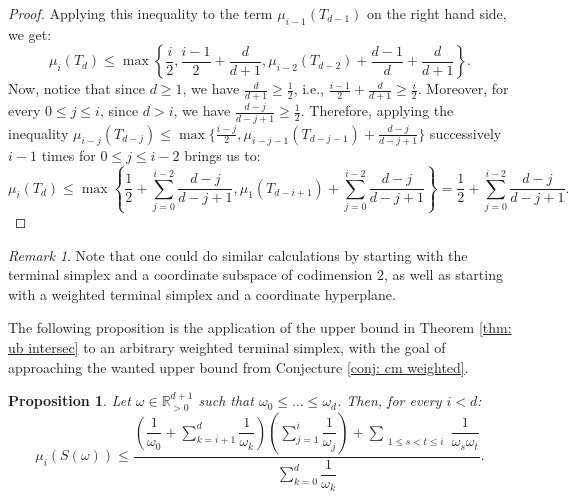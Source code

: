 \documentclass{amsart}
\newtheorem{proposition}[theorem]{Proposition}
\theoremstyle{definition}
\theoremstyle{remark}
\newtheorem{remark}[theorem]{Remark}
\newcommand{\R}{\mathbb{R}}
\begin{document}
\begin{proof}
Applying this inequality to the term $\mu_{i-1}(T_{d-1})$ on the right hand side, we get:
$$\mu_i(T_d)\leqslant \max \left\{ \frac{i}{2}, \frac{i-1}{2}+\frac{d}{d+1}, \mu_{i-2}(T_{d-2})+\frac{d-1}{d}+\frac{d}{d+1}\right\}.$$ 
Now, notice that since $d\geq 1$, we have $\frac{d}{d+1}\geq \frac{1}{2}$, i.e., $\frac{i-1}{2}+\frac{d}{d+1}\geq \frac{i}{2}$. Moreover, for every $0\leqslant j\leqslant i$, since $d>i$, we have $\frac{d-j}{d-j+1}\geq \frac{1}{2}$. Therefore, applying the inequality $\mu_{i-j}(T_{d-j})\leqslant \max \{ \frac{i-j}{2}, \mu_{i-j-1}(T_{d-j-1})+\frac{d-j}{d-j+1}\}$ successively $i-1$ times for $0\leqslant j \leqslant i-2$ brings us to:
$$\mu_i(T_d)\leqslant \max \left\{\frac{1}{2}+\sum\limits_{j=0}^{i-2} \frac{d-j}{d-j+1}, \mu_1(T_{d-i+1})+ \sum\limits_{j=0}^{i-2} \frac{d-j}{d-j+1}\right\}=\frac{1}{2}+\sum\limits_{j=0}^{i-2} \frac{d-j}{d-j+1}.$$
\end{proof}


\begin{remark}
Note that one could do similar calculations by starting with the terminal simplex and  a coordinate subspace of codimension $2$, as well as starting with a weighted terminal simplex and a coordinate hyperplane.
\end{remark}

The following proposition is the application of the upper bound in Theorem \ref{thm: ub intersec} to an arbitrary weighted terminal simplex, with the goal of approaching the wanted upper bound from Conjecture \ref{conj: cm weighted}. 


\begin{proposition}
Let $\omega\in \R^{d+1}_{>0}$ such that $\omega_0\leqslant \dots \leqslant \omega_d$. Then, for every $i<d$:
\[
\mu_i(S(\omega)) \leqslant
\frac{
\left(\dfrac{1}{\omega_0}+\sum\limits_{k=i+1}^{d}\dfrac{1}{\omega_k}\right)
\left(\sum\limits_{j=1}^{i}\dfrac{1}{\omega_j}\right)
+\sum\limits_{\substack{1\le s<t\le i}}\dfrac{1}{\omega_s\omega_t}
}{
\sum\limits_{k=0}^{d}\dfrac{1}{\omega_k}
}.
\]

\end{proposition}
\end{document}
